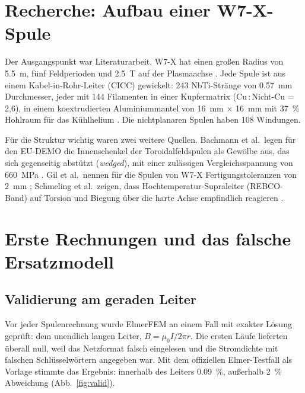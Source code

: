 \documentclass[10pt,a4paper]{article}
\begin{document}
\section{Recherche: Aufbau einer W7-X-Spule}
Der Ausgangspunkt war Literaturarbeit. W7-X hat einen großen Radius von \SI{5,5}{m}, fünf Feldperioden und
\SI{2,5}{T} auf der Plasmaachse \cite{bosch2013}. Jede Spule ist aus einem Kabel-in-Rohr-Leiter (CICC)
gewickelt: 243 NbTi-Stränge von \SI{0,57}{mm} Durchmesser, jeder mit 144 Filamenten in einer Kupfermatrix
(Cu\,:\,Nicht-Cu = 2,6), in einem koextrudierten Aluminiummantel von \SI{16}{mm} $\times$ \SI{16}{mm} mit \SI{37}{\%} Hohlraum
für das Kühlhelium \cite{rummel2005,maix2006}. Die nichtplanaren Spulen haben 108 Windungen.

Für die Struktur wichtig waren zwei weitere Quellen. Bachmann et al.\ legen für den EU-DEMO die Innenschenkel
der Toroidalfeldspulen als Gewölbe aus, das sich gegenseitig abstützt (\emph{wedged}), mit einer zulässigen
Vergleichsspannung von \SI{660}{MPa} \cite{bachmann2024}. Gil et al.\ nennen für die Spulen von W7-X
Fertigungstoleranzen von \SI{2}{mm} \cite{gil2025}; Schmeling et al.\ zeigen, dass Hochtemperatur-Supraleiter
(REBCO-Band) auf Torsion und Biegung über die harte Achse empfindlich reagieren \cite{schmeling2025}.

\section{Erste Rechnungen und das falsche Ersatzmodell}
\subsection{Validierung am geraden Leiter}
Vor jeder Spulenrechnung wurde ElmerFEM an einem Fall mit exakter Lösung geprüft: dem unendlich langen Leiter,
$B=\mu_0 I/2\pi r$. Die ersten Läufe lieferten überall null, weil das Netzformat falsch eingelesen und die
Stromdichte mit falschen Schlüsselwörtern angegeben war. Mit dem offiziellen Elmer-Testfall als Vorlage stimmte
das Ergebnis: innerhalb des Leiters \SI{0,09}{\%}, außerhalb \SI{2}{\%} Abweichung (Abb.~\ref{fig:valid}).
\end{document}
